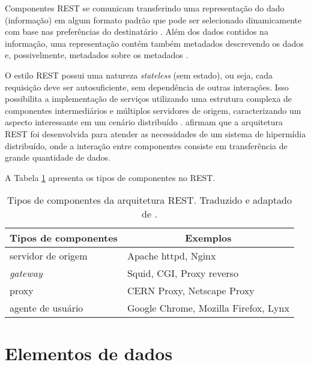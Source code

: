     Componentes REST se comunicam transferindo uma representação do dado (informação) em algum formato padrão que pode
    ser selecionado dinamicamente com base nas preferências do destinatário \cite{fielding2002}. Além dos dados contidos na 
    informação, uma representação contém também metadados descrevendo os dados e, possivelmente, metadados sobre os
    metadados \cite{fielding2002}.
    
    O estilo REST possui uma natureza \textit{stateless} (sem estado), ou seja, cada requisição deve ser autosuficiente, sem
    dependência de outras interações. Isso possibilita a implementação de serviços utilizando uma estrutura complexa de componentes
    intermediários e múltiplos servidores de origem, caracterizando um aspecto interessante em um cenário distribuído \cite{fielding2002}.
     afirmam que a arquitetura REST foi desenvolvida para atender as necessidades de um sistema de
    hipermídia distribuído, onde a interação entre componentes consiste em transferência de grande quantidade de dados.
    
    A Tabela \ref{rest-components-elements} apresenta os tipos de componentes no REST.
  
    \begin{table}[ht!]
    \centering
    \caption{Tipos de componentes da arquitetura REST. Traduzido e adaptado de \cite{fielding2002}.}
    \label{rest-components-elements}
    \begin{tabular}{l|l}
    \hline
    \multicolumn{1}{c|}{\textbf{Tipos de componentes}} & \multicolumn{1}{c}{\textbf{Exemplos}} \\ \hline
    servidor de origem                                  & Apache httpd, Nginx                    \\ \hline
    \textit{gateway}                                    & Squid, CGI, Proxy reverso              \\ \hline
    proxy                                               & CERN Proxy, Netscape Proxy             \\ \hline
    agente de usuário                                   & Google Chrome, Mozilla Firefox, Lynx   \\ \hline
    \end{tabular}
    \end{table}
  
  \section{Elementos de dados}
    

